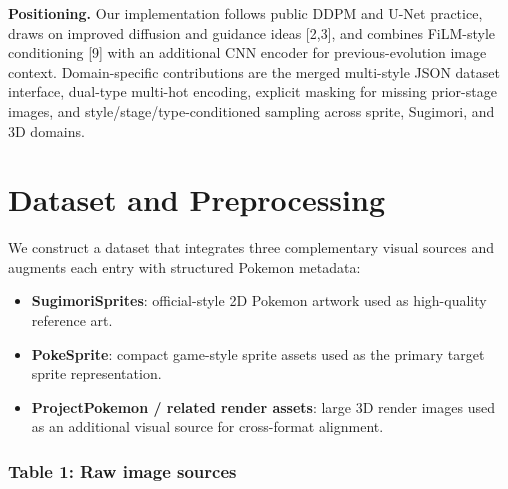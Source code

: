 \documentclass[
]{article}
\providecommand{\tightlist}{%
  \setlength{\itemsep}{0pt}\setlength{\parskip}{0pt}}
\begin{document}
\textbf{Positioning.} Our implementation follows public DDPM and U-Net
practice, draws on improved diffusion and guidance ideas {[}2,3{]}, and
combines FiLM-style conditioning {[}9{]} with an additional CNN encoder
for previous-evolution image context. Domain-specific contributions are
the merged multi-style JSON dataset interface, dual-type multi-hot
encoding, explicit masking for missing prior-stage images, and
style/stage/type-conditioned sampling across sprite, Sugimori, and 3D
domains.

\section{Dataset and Preprocessing}\label{dataset-and-preprocessing}

We construct a dataset that integrates three complementary visual sources
and augments each entry with structured Pokemon metadata:

\begin{itemize}
\tightlist
\item
  \textbf{SugimoriSprites}: official-style 2D Pokemon artwork used as
  high-quality reference art.
\item
  \textbf{PokeSprite}: compact game-style sprite assets used as the
  primary target sprite representation.
\item
  \textbf{ProjectPokemon / related render assets}: large 3D render
  images used as an additional visual source for cross-format alignment.
\end{itemize}

\subsubsection{Table 1: Raw image
sources}\label{table-1.-raw-image-sources}
\end{document}
